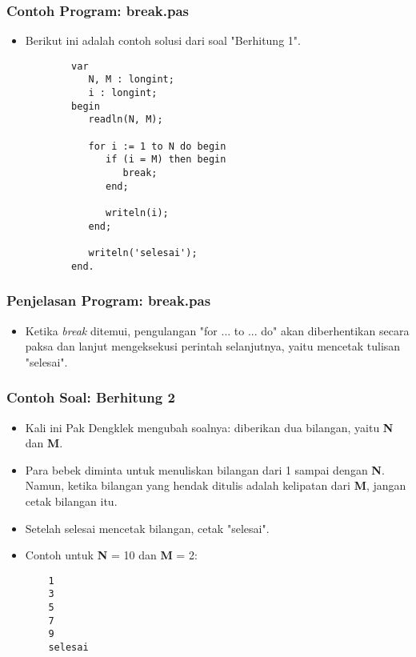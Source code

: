 \documentclass{beamer}
\begin{document}
\begin{frame}[fragile]
\frametitle{Contoh Program: break.pas}
\begin{itemize}
    \item Berikut ini adalah contoh solusi dari soal "Berhitung 1".
    \begin{lstlisting}
        var
           N, M : longint;
           i : longint;
        begin
           readln(N, M);

           for i := 1 to N do begin
              if (i = M) then begin
                 break;
              end;

              writeln(i);
           end;

           writeln('selesai');
        end.
    \end{lstlisting}
\end{itemize}
\end{frame}

\begin{frame}
\frametitle{Penjelasan Program: break.pas}
\begin{itemize}
    \item Ketika \textit{break} ditemui, pengulangan "for ... to ... do" akan diberhentikan secara paksa dan lanjut mengeksekusi perintah selanjutnya, yaitu mencetak tulisan "selesai".
\end{itemize}
\end{frame}

\begin{frame}[fragile]
\frametitle{Contoh Soal: Berhitung 2}
\begin{itemize}
    \item Kali ini Pak Dengklek mengubah soalnya: diberikan dua bilangan, yaitu \textbf{N} dan \textbf{M}.
    \item Para bebek diminta untuk menuliskan bilangan dari 1 sampai dengan \textbf{N}. Namun, ketika bilangan yang hendak ditulis adalah \alert{kelipatan} dari \textbf{M}, jangan cetak bilangan itu.
    \item Setelah selesai mencetak bilangan, cetak "selesai".
    \item Contoh untuk \textbf{N} = 10 dan \textbf{M} = 2:
    \begin{lstlisting}
    1
    3
    5
    7
    9
    selesai
    \end{lstlisting}
\end{itemize}
\end{frame}
\end{document}
